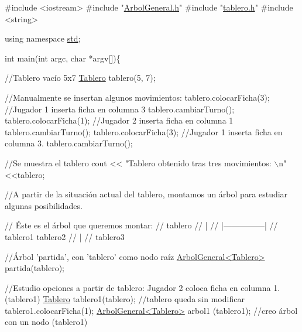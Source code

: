 \begin{DoxyCode}
\textcolor{preprocessor}{#include <iostream>}
\textcolor{preprocessor}{#include "\hyperlink{ArbolGeneral_8h}{ArbolGeneral.h}"}
\textcolor{preprocessor}{#include "\hyperlink{tablero_8h}{tablero.h}"}
\textcolor{preprocessor}{#include <string>}

\textcolor{keyword}{using namespace }\hyperlink{namespacestd}{std};


\textcolor{keywordtype}{int} main(\textcolor{keywordtype}{int} argc, \textcolor{keywordtype}{char} *argv[])\{

  \textcolor{comment}{//Tablero vacío 5x7}
    \hyperlink{classTablero}{Tablero} tablero(5, 7);

    \textcolor{comment}{//Manualmente se insertan algunos movimientos: }
    tablero.colocarFicha(3);  \textcolor{comment}{//Jugador 1 inserta ficha en columna 3}
    tablero.cambiarTurno();
    tablero.colocarFicha(1);  \textcolor{comment}{//Jugador 2 inserta ficha en columna 1}
    tablero.cambiarTurno();
    tablero.colocarFicha(3);  \textcolor{comment}{//Jugador 1 inserta ficha en columna 3.}
    tablero.cambiarTurno();
    
    \textcolor{comment}{//Se muestra el tablero }
    cout << \textcolor{stringliteral}{"Tablero obtenido tras tres movimientos: \(\backslash\)n"}<<tablero; 

    \textcolor{comment}{//A partir de la situación actual del tablero, montamos un árbol para estudiar algunas posibilidades. }

    \textcolor{comment}{// Éste es el árbol que queremos montar: }
    \textcolor{comment}{//        tablero}
    \textcolor{comment}{//          |}
    \textcolor{comment}{//      |---------------|}
    \textcolor{comment}{//    tablero1      tablero2}
    \textcolor{comment}{//                      |}
    \textcolor{comment}{//                  tablero3}


    \textcolor{comment}{//Árbol 'partida', con 'tablero' como nodo raíz}
    \hyperlink{classArbolGeneral}{ArbolGeneral<Tablero>} partida(tablero);

    \textcolor{comment}{//Estudio opciones a partir de tablero: Jugador 2 coloca ficha en columna 1. (tablero1)}
    \hyperlink{classTablero}{Tablero} tablero1(tablero);          \textcolor{comment}{//tablero queda sin modificar}
    tablero1.colocarFicha(1);   
    \hyperlink{classArbolGeneral}{ArbolGeneral<Tablero>} arbol1 (tablero1);  \textcolor{comment}{//creo árbol con un nodo (tablero1)}


\end{DoxyCode}
